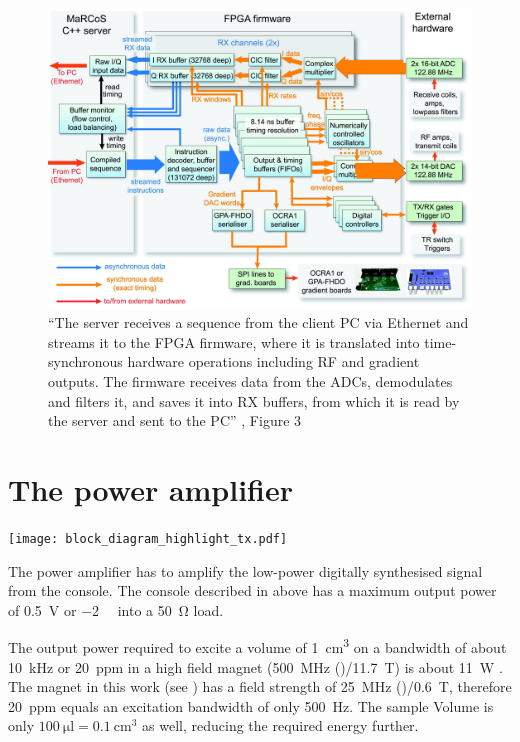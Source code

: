 \begin{figure}[hbt]
    \centering
    \includegraphics{images/marcos.jpg}
    \caption{ \enquote{The server receives a sequence from the client PC via Ethernet and streams it to the FPGA firmware, where it is translated into time-synchronous hardware operations including RF and gradient outputs. The firmware receives data from the ADCs, demodulates and filters it, and saves it into RX buffers, from which it is read by the server and sent to the PC} \cite{negnevitskyMaRCoSOpensourceElectronic2023}, Figure 3}
\end{figure}


\section{The power amplifier}
\begin{marginfigure}[-4.5\baselineskip]
    \texttt{[image: block\_diagram\_highlight\_tx.pdf]}
\end{marginfigure}

The power amplifier has to amplify the low-power digitally synthesised signal from the console. The console described in  above has a maximum output power of \qty{0.5}{\volt} or \qty{-2}{\deci\belm} into a \qty{50}{\ohm} load.

The output power required to excite a volume of \qty{1}{\centi\meter\cubed} on a bandwidth of about \qty{10}{\kilo\hertz} or \qty{20}{ppm} in a high field magnet (\qty{500}{\mega\hertz} ()/\qty{11.7}{\tesla}) is about \qty{11}{\watt} . The magnet in this work (see ) has a field strength of \qty{25}{\mega\hertz} ()/\qty{0.6}{\tesla}, therefore \qty{20}{ppm} equals an excitation bandwidth of only \qty{500}{\hertz}. The sample Volume is only \(\qty{100}{\micro\litre} = \qty{0.1}{\centi\meter\cubed}\) as well, reducing the required energy further.

